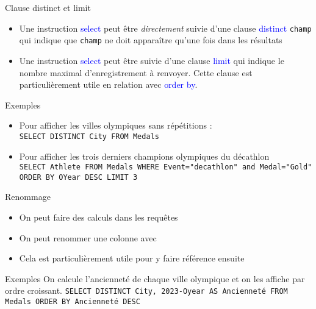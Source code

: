 \documentclass[10pt]{beamer}
\begin{document}
\begin{frame}{\Ctitle}{\stitle}
	\begin{alertblock}{Clause {\sc distinct} et {\sc limit}}
		\begin{itemize}
			\item<2-> Une instruction \textcolor{blue}{\sc select} peut être \textit{directement} suivie d'une clause \textcolor{blue}{\sc distinct} {\tt champ} qui indique que {\tt champ} ne doit apparaître qu'une fois dans les résultats
			\item<3-> Une instruction \textcolor{blue}{\sc select} peut être suivie d'une clause \textcolor{blue}{\sc limit} qui indique le nombre maximal d'enregistrement à renvoyer. Cette clause est particulièrement utile en relation avec \textcolor{blue}{\sc order by}.
		\end{itemize}
	\end{alertblock}
	\begin{exampleblock}{Exemples}
		\begin{itemize}
			\item<5-> Pour afficher les villes olympiques  sans répétitions :\\
				\onslide<6->\texttt{SELECT DISTINCT City FROM Medals}
			\item<7-> Pour afficher les trois derniers champions olympiques du décathlon\\
				\onslide<8->\texttt{SELECT Athlete FROM Medals WHERE Event="decathlon" and Medal="Gold" ORDER BY OYear DESC LIMIT 3}
		\end{itemize}
	\end{exampleblock}
\end{frame}


\begin{frame}{\Ctitle}{\stitle}
	\begin{alertblock}{Renommage}
		\begin{itemize}
			\item<1-> On peut faire des calculs dans les requêtes
			\item<2-> On peut renommer une colonne avec 
			\item<3-> Cela est particulièrement utile pour y faire référence ensuite
		\end{itemize}
	\end{alertblock}
	\begin{exampleblock}{Exemples}
		\onslide<4-> On calcule l'ancienneté de chaque ville olympique et on les affiche par ordre croissant.
		\onslide<5->\texttt{SELECT DISTINCT City, 2023-Oyear AS Ancienneté FROM Medals ORDER BY Ancienneté DESC}
	\end{exampleblock}
\end{frame}
\end{document}
